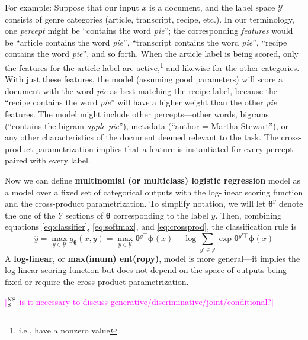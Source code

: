 \documentclass[11pt,letterpaper]{article}
\newcommand{\ensuretext}[1]{#1}
\newcommand{\nssmarker}{\ensuretext{\textcolor{magenta}{\ensuremath{^{\textsc{NS}}_{\textsc{S}}}}}}
\newcommand{\arkcomment}[3]{\ensuretext{\textcolor{#3}{[#1 #2]}}}
\newcommand{\nss}[1]{\arkcomment{\nssmarker}{#1}{magenta}}
\newcommand{\params}{\mathbf{\theta}}
\newcommand{\eref}[1]{\eqref{#1}}
\begin{document}
For example: Suppose that our input $x$ is a document, and the label space $\mathcal{Y}$ consists of genre categories ({\sc article}, {\sc transcript}, {\sc recipe}, etc.).
In our terminology, one {\em percept} might be ``contains the word \textit{pie}''; the corresponding {\em features} 
would be ``{\sc article} contains the word \textit{pie}'', ``{\sc transcript} contains the word \textit{pie}'', ``{\sc recipe} contains the word \textit{pie}'', 
and so forth. When the {\sc article} label is being scored, only the features for the {\sc article} label are active,\footnote{i.e., have a nonzero value} 
and likewise for the other categories. With just these features, the model (assuming good parameters) will score 
a document with the word \textit{pie} as best matching the {\sc recipe} label, because the 
``{\sc recipe} contains the word \textit{pie}'' will have a higher weight than the other \textit{pie} features.
The model might include other percepts---other words, bigrams (``contains the bigram \textit{apple pie}''), 
metadata (``author = Martha Stewart''), or any other characteristics of the document deemed relevant to the task.
The cross-product parametrization implies that a feature is instantiated for every percept paired with every label.


Now we can define {\bf multinomial (or multiclass) logistic regression} model 
as a model over a fixed set of categorical outputs with the log-linear scoring function and the cross-product parametrization.
To simplify notation, we will let $\boldsymbol{\theta}^y$ denote the one of the $Y$ sections of $\boldsymbol{\theta}$ 
corresponding to the label $y$. 
Then, combining equations \eref{eq:classifier}, \eref{eq:softmax}, and \eref{eq:crossprod}, 
the classification rule is
\begin{equation}\label{eq:logistic}
\hat{y} = \max_{y\in\mathcal{Y}} g_\params(x,y) = \max_{y\in\mathcal{Y}} \boldsymbol{\theta}^{y\top} \boldsymbol{\phi}(x) - \log{\sum_{y'\in\mathcal{Y}}{\exp{\boldsymbol{\theta}^{y'\top} \boldsymbol{\phi}(x)}}}
\end{equation} 
A {\bf log-linear}, or {\bf max(imum) ent(ropy)}, model is more general---it implies the log-linear scoring function 
but does not depend on the space of outputs being fixed or require the cross-product parametrization.

\nss{is it necessary to discuss generative/discriminative/joint/conditional?}
\\
\end{document}
